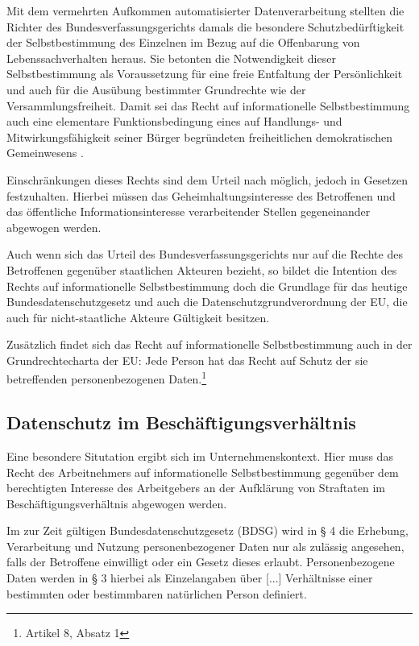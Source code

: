 Mit dem vermehrten Aufkommen automatisierter Datenverarbeitung stellten die Richter des Bundesverfassungsgerichts damals die besondere Schutzbedürftigkeit der Selbstbestimmung des Einzelnen im Bezug auf die Offenbarung von Lebenssachverhalten heraus. Sie betonten die Notwendigkeit dieser Selbstbestimmung als Voraussetzung für eine freie Entfaltung der Persönlichkeit und auch für die Ausübung bestimmter Grundrechte wie der Versammlungsfreiheit. Damit sei das Recht auf informationelle Selbstbestimmung auch \glqq eine elementare Funktionsbedingung eines auf Handlungs- und Mitwirkungsfähigkeit seiner Bürger begründeten freiheitlichen demokratischen Gemeinwesens\grqq{} \cite{TODO} .
    
Einschränkungen dieses Rechts sind dem Urteil nach möglich, jedoch in Gesetzen festzuhalten. Hierbei müssen das Geheimhaltungsinteresse des Betroffenen und das öffentliche Informationsinteresse verarbeitender Stellen gegeneinander abgewogen werden.

Auch wenn sich das Urteil des Bundesverfassungsgerichts nur auf die Rechte des Betroffenen gegenüber staatlichen Akteuren bezieht, so bildet die Intention des Rechts auf informationelle Selbstbestimmung doch die Grundlage für das heutige Bundesdatenschutzgesetz und auch die Datenschutzgrundverordnung der EU, die auch für nicht-staatliche Akteure Gültigkeit besitzen.

Zusätzlich findet sich das Recht auf informationelle Selbstbestimmung auch in der Grundrechtecharta der EU: \glqq Jede Person hat das Recht auf Schutz der sie betreffenden personenbezogenen Daten.\grqq{}\footnote{
  Artikel 8, Absatz 1
}

\subsection*{Datenschutz im Beschäftigungsverhältnis}

Eine besondere Situtation ergibt sich im Unternehmenskontext. Hier muss das Recht des Arbeitnehmers auf informationelle Selbstbestimmung gegenüber dem berechtigten Interesse des Arbeitgebers an der Aufklärung von Straftaten im Beschäftigungsverhältnis abgewogen werden. 

Im zur Zeit gültigen Bundesdatenschutzgesetz (BDSG) wird in § 4 die Erhebung, Verarbeitung und Nutzung personenbezogener Daten nur als zulässig angesehen, falls der Betroffene einwilligt oder ein Gesetz dieses erlaubt. Personenbezogene Daten werden in § 3 hierbei als \glqq Einzelangaben über [...] Verhältnisse einer bestimmten oder bestimmbaren natürlichen Person\grqq{}  definiert.

